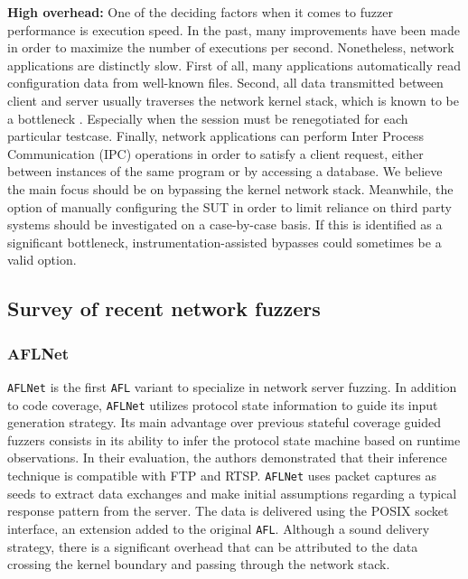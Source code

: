 \textbf{High overhead:} One of the deciding factors when it comes to fuzzer performance is execution speed. In the past, many improvements have been made in order to maximize the number of executions per second. Nonetheless, network applications are distinctly slow. First of all, many applications automatically read configuration data from well-known files. Second, all data transmitted between client and server usually traverses the network kernel stack, which is known to be a bottleneck \cite{hoiland2018express,scholz2014look,kuenzer2021unikraft}. Especially when the session must be renegotiated for each particular testcase. Finally, network applications can perform Inter Process Communication (IPC) operations in order to satisfy a client request, either between instances of the same program or by accessing a database. We believe the main focus should be on bypassing the kernel network stack. Meanwhile, the option of manually configuring the SUT in order to limit reliance on third party systems should be investigated on a case-by-case basis. If this is identified as a significant bottleneck, instrumentation-assisted bypasses could sometimes be a valid option.

\subsection{Survey of recent network fuzzers}
\label{extend:netfuzz:survey}

\subsubsection{AFLNet}
\label{extend:netfuzz:survey:aflnet}

\texttt{AFLNet} \cite{pham2020aflnet} is the first \texttt{AFL} variant to specialize in network server fuzzing. In addition to code coverage, \texttt{AFLNet} utilizes protocol state information to guide its input generation strategy. Its main advantage over previous stateful coverage guided fuzzers consists in its ability to infer the protocol state machine based on runtime observations. In their evaluation, the authors demonstrated that their inference technique is compatible with FTP and RTSP. \texttt{AFLNet} uses packet captures as seeds to extract data exchanges and make initial assumptions regarding a typical response pattern from the server. The data is delivered using the POSIX socket interface, an extension added to the original \texttt{AFL}. Although a sound delivery strategy, there is a significant overhead that can be attributed to the data crossing the kernel boundary and passing through the network stack.

